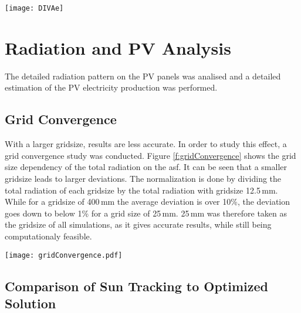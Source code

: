 	\begin{figure*}
		\begin{center}
		\texttt{[image: DIVAe]}
		\caption{Carpet plots detailing the net energy consumption. Each square represents the total energy consumption for that specific hour of the entire month. Red colours detail the energy demand, while blue colours detail the energy supply.}
		\label{f:DIVAe}
		\end{center}
	\end{figure*}
	
\section{Radiation and PV Analysis}
	
	The detailed radiation pattern on the PV panels was analised and a detailed estimation of the PV electricity production was performed. 
	

	\subsection{Grid Convergence}

		With a larger gridsize, results are less accurate. In order to study this effect, a grid convergence study was conducted. Figure \ref{f:gridConvergence} shows the grid size dependency of the total radiation on the asf. It can be seen that a smaller gridsize leads to larger deviations. The normalization is done by dividing the total radiation of each gridsize by the total radiation with gridsize 12.5\,mm. While for a gridsize of 400\,mm the average deviation is over 10\%, the deviation goes down to below 1\% for a grid size of 25\,mm. 25\,mm was therefore taken as the gridsize of all simulations, as it gives accurate results, while still being computationaly feasible. 

		\begin{figure*}
			\begin{center}
			\texttt{[image: gridConvergence.pdf]}
			\caption{Grid convergence evaluation}
			\label{f:gridConvergence}
			\end{center}
		\end{figure*}

	\subsection{Comparison of Sun Tracking to Optimized Solution}

